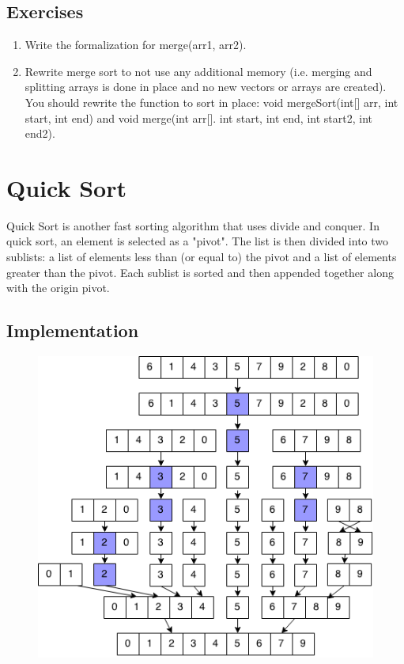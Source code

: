 \documentclass[11pt,oneside]{book}
\makeatletter
\def\maxwidth#1{\ifdim\Gin@nat@width>#1 #1\else\Gin@nat@width\fi}
\makeatother
\begin{document}
\subsection{Exercises}

\begin{enumerate}
\item Write the formalization for merge(arr1, arr2). 
\item Rewrite merge sort to not use any additional memory (i.e. merging and splitting arrays is done in place and no new vectors or arrays are created). You should rewrite the function to sort in place: void mergeSort(int[] arr, int start, int end) and void merge(int arr[]. int start, int end, int start2, int end2).
\end{enumerate}

        \section{ Quick Sort }
        

Quick Sort is another fast sorting algorithm that uses divide and conquer. In quick sort, an element is selected as a "pivot". The list is then divided into two sublists: a list of elements less than (or equal to) the pivot and a list of elements greater than the pivot. Each sublist is sorted and then appended together along with the origin pivot.

\subsection{Implementation}

\vspace{5px}\begin{figure}[H]\centering
        \includegraphics[width=0.66\maxwidth{\textwidth}]{quicksort.png}
        \end{figure}
\end{document}
